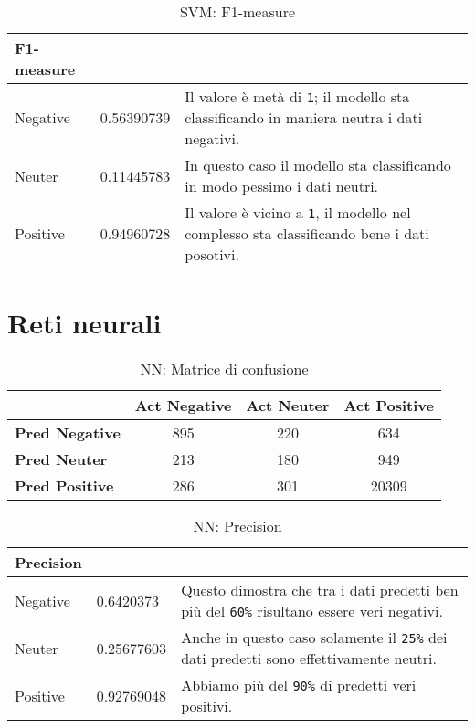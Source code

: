 		\begin{table} [H]
			\caption{SVM: F1-measure}
			\label{tab:F1-measureSVM}
			\centering
			\begin{tabular}{llp{}}
				\toprule 
				\textbf{F1-measure}	\\
				\midrule
				Negative  & 0.56390739  & Il valore è metà di \verb|1|; il modello sta classificando in maniera neutra i dati negativi.\\
				Neuter & 0.11445783 & In questo caso il modello sta classificando in modo pessimo i dati neutri.\\
				Positive & 0.94960728 & Il valore è vicino a \verb|1|, il modello nel complesso sta classificando bene i dati posotivi.\\
				\bottomrule
			\end{tabular}
		\end{table}


	
	\section{Reti neurali}
		\begin{table} [H]
			\caption{NN: Matrice di confusione}
			\label{tab:matriceConfusioneNN}
			\centering
			\begin{tabular}{lccc}
				\toprule 
				& \textbf{Act Negative} & \textbf{Act Neuter}	& \textbf{Act Positive}\\
				\midrule
				\textbf{Pred Negative}  & 895 & 220 & 634\\
				\textbf{Pred Neuter} & 213 & 180 & 949\\
				\textbf{Pred Positive} & 286 & 301 & 20309\\
				\bottomrule
			\end{tabular}
		\end{table}
		
		\begin{table} [H]
			\caption{NN: Precision}
			\label{tab:precisionNN}
			\centering
			\begin{tabular}{llp{}}
				\toprule 
				\textbf{Precision}	\\
				\midrule
				Negative  & 0.6420373  & Questo dimostra che tra i dati predetti ben più del \verb|60%| risultano essere veri negativi.\\
				Neuter & 0.25677603 & Anche in questo caso solamente il \verb|25%| dei dati predetti sono effettivamente neutri.\\
				Positive & 0.92769048 & Abbiamo più del \verb|90%| di predetti veri positivi.\\
				\bottomrule
			\end{tabular}
		\end{table}
		
